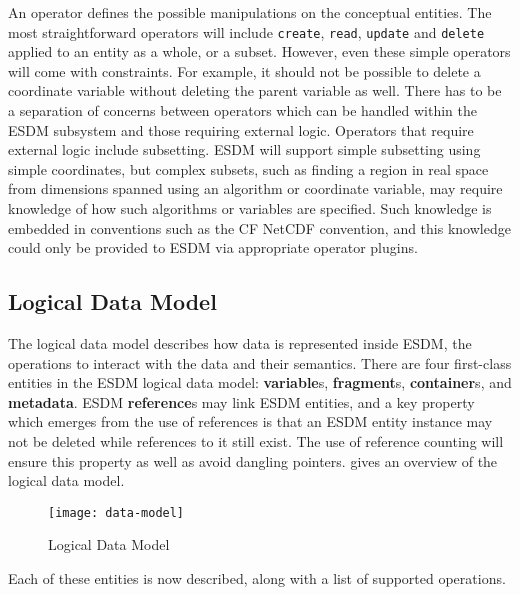\begin{description}
An operator defines the possible manipulations on the conceptual entities. The most straightforward operators will include \texttt{create}, \texttt{read}, \texttt{update} and \texttt{delete} applied to an entity as a whole, or a subset. However, even these simple operators will come with constraints. For example, it should not be possible to delete a coordinate variable without deleting the parent variable as well. There has to be a separation of concerns between operators which can be handled within the ESDM subsystem and those requiring external logic. Operators that require external logic include subsetting. ESDM will support simple subsetting using simple coordinates, but complex subsets, such as finding a region in real space from dimensions spanned using an algorithm or coordinate variable, may require knowledge of how such algorithms or variables are specified.
Such knowledge is embedded in conventions such as the CF NetCDF convention, and this knowledge could only be provided to ESDM via appropriate operator plugins.

\end{description}

\subsection{Logical Data Model}
\label{subsec-ldm}

\tab
The logical data model describes how data is represented inside ESDM, the operations to interact with the data and their semantics. There are four first-class entities in the ESDM logical data model: \textbf{variable}s, \textbf{fragment}s, \textbf{container}s, and \textbf{metadata}. ESDM \textbf{reference}s may link ESDM entities, and a key property which emerges from the use of references is that an ESDM entity instance may not be deleted while references to it still exist. The use of reference counting will ensure this property as well as avoid dangling pointers.  gives an overview of the logical data model.

\begin{figure}[H]
    \centering
    \texttt{[image: data-model]}
    \caption{Logical Data Model}
    \label{fig:data-model}
\end{figure}

Each of these entities is now described, along with a list of supported operations.

